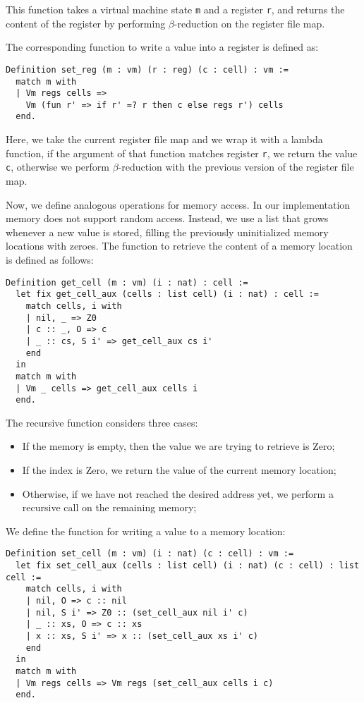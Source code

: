 This function takes a virtual machine state \texttt m and a register \texttt r, and returns the content of the register  by performing $\beta$-reduction on the register file map.

The corresponding function to write a value into a register is defined as:

\begin{lstlisting}[style=Rocq]
Definition set_reg (m : vm) (r : reg) (c : cell) : vm :=
  match m with
  | Vm regs cells =>
    Vm (fun r' => if r' =? r then c else regs r') cells
  end.
\end{lstlisting}

Here, we take the current register file map and we wrap it with a lambda function, if the argument of that function matches register \texttt r, we return the value \texttt c, otherwise we perform $\beta$-reduction with the previous version of the register file map.

Now, we define analogous operations for memory access. In our implementation memory does not support random access. Instead, we use a list that grows whenever a new value is stored, filling the previously uninitialized memory locations with zeroes. The function to retrieve the content of a memory location is defined as follows:

\begin{lstlisting}[style=Rocq]
Definition get_cell (m : vm) (i : nat) : cell :=
  let fix get_cell_aux (cells : list cell) (i : nat) : cell :=
    match cells, i with
    | nil, _ => Z0
    | c :: _, O => c
    | _ :: cs, S i' => get_cell_aux cs i'
    end
  in
  match m with
  | Vm _ cells => get_cell_aux cells i
  end.
\end{lstlisting}

The recursive function considers three cases:
\begin{itemize}
  \item If the memory is empty, then the value we are trying to retrieve is Zero;
  \item If the index is Zero, we return the value of the current memory location;
  \item Otherwise, if we have not reached the desired address yet, we perform a recursive call on the remaining memory;
\end{itemize}

We define the function for writing a value to a memory location:

\begin{lstlisting}[style=Rocq]
Definition set_cell (m : vm) (i : nat) (c : cell) : vm :=
  let fix set_cell_aux (cells : list cell) (i : nat) (c : cell) : list cell :=
    match cells, i with
    | nil, O => c :: nil
    | nil, S i' => Z0 :: (set_cell_aux nil i' c)
    | _ :: xs, O => c :: xs
    | x :: xs, S i' => x :: (set_cell_aux xs i' c)
    end
  in
  match m with
  | Vm regs cells => Vm regs (set_cell_aux cells i c)
  end.
\end{lstlisting}

